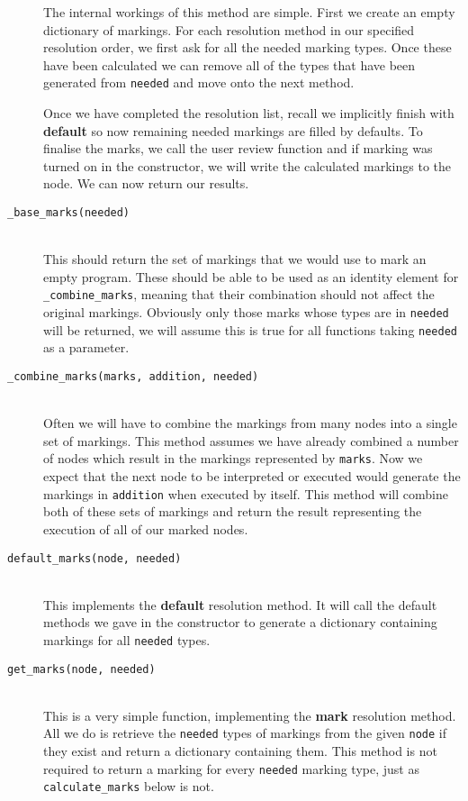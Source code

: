 \documentclass[twoside,a4paper]{report}
\begin{document}
\begin{description}
The internal workings of this method are simple. First we create an empty dictionary of markings. For each resolution method in our specified resolution
order, we first ask for all the needed marking types. Once these have been calculated we can remove all of the types that have been generated from \texttt{needed}
and move onto the next method.

Once we have completed the resolution list, recall we implicitly finish with \textbf{default} so now remaining needed markings are filled by defaults.
To finalise the marks, we call the user review function and if marking was turned on in the constructor, we will write the calculated markings to the
node. We can now return our results.

\item[\texttt{\_base\_marks(needed)}] \hfill \\
This should return the set of markings that we would use to mark an empty program. These should be able to be used as an identity element for
\texttt{\_combine\_marks}, meaning that their combination should not affect the original markings. Obviously only those marks whose types are in
\texttt{needed} will be returned, we will assume this is true for all functions taking \texttt{needed} as a parameter.

\item[\texttt{\_combine\_marks(marks, addition, needed)}] \hfill \\
Often we will have to combine the markings from many nodes into a single set of markings. This method assumes we have already combined a number of nodes
which result in the markings represented by \texttt{marks}. Now we expect that the next node to be interpreted or executed would generate the markings
in \texttt{addition} when executed by itself. This method will combine both of these sets of markings and return the result representing the execution of all
of our marked nodes.

\item[\texttt{default\_marks(node, needed)}] \hfill \\
This implements the \textbf{default} resolution method. It will call the default methods we gave in the constructor to generate a dictionary containing
markings for all \texttt{needed} types.

\item[\texttt{get\_marks(node, needed)}] \hfill \\
This is a very simple function, implementing the \textbf{mark} resolution method. All we do is retrieve the \texttt{needed} types of markings from the
given \texttt{node} if they exist and return a dictionary containing them. This method is not required to return a marking for every \texttt{needed}
marking type, just as \texttt{calculate\_marks} below is not.


\end{description}
\end{document}
